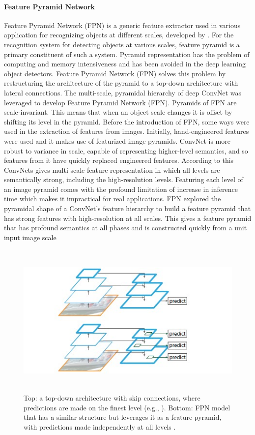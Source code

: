 {\paragraph{Feature Pyramid Network}

Feature Pyramid Network (FPN) is a generic feature extractor used in various application for recognizing objects at different scales, developed by \cite{K}. For the recognition system for detecting objects at various scales, feature pyramid is a primary constituent of such a system. Pyramid representation has the problem of computing and memory intensiveness and has been avoided in the deep learning object detectors. 
Feature Pyramid Network (FPN) solves this problem by restructuring the architecture of the pyramid to a top-down architecture with lateral connections. The multi-scale, pyramidal hierarchy of deep ConvNet was leveraged to develop Feature Pyramid Network (FPN). Pyramids of  FPN are scale-invariant. This means that when an object scale changes it is offset by shifting its level in the pyramid.  
 Before the introduction of FPN, some ways were used in the extraction of features from images. Initially, hand-engineered features \cite{Lowe2004} were used and it makes use of featurized image pyramids. ConvNet is more robust to variance in scale, capable of representing higher-level semantics, and so features from it have quickly replaced engineered features. 
 According to \cite{L} this ConvNets gives multi-scale feature representation in which all levels are semantically strong, including the high-resolution levels.  Featuring each level of an image pyramid comes with the profound limitation of increase in inference time which makes it impractical for real applications. FPN explored the pyramidal shape of a ConvNet’s feature hierarchy to build a feature pyramid that has strong features
  with high-resolution at all scales. 
 This gives a feature pyramid that has profound semantics at all phases and is constructed quickly  from a unit  input image scale 
\begin{figure}[H]
\centering
  \includegraphics[height=3in]{images/fpn.jpg}
   \caption{Top: a top-down architecture with skip connections, where predictions are made on the finest level (e.g., \protect\cite{T}). Bottom: FPN model that has a similar structure but leverages it as a feature pyramid, with predictions made independently at all levels \protect\cite{K}.}
\end{figure}

}
